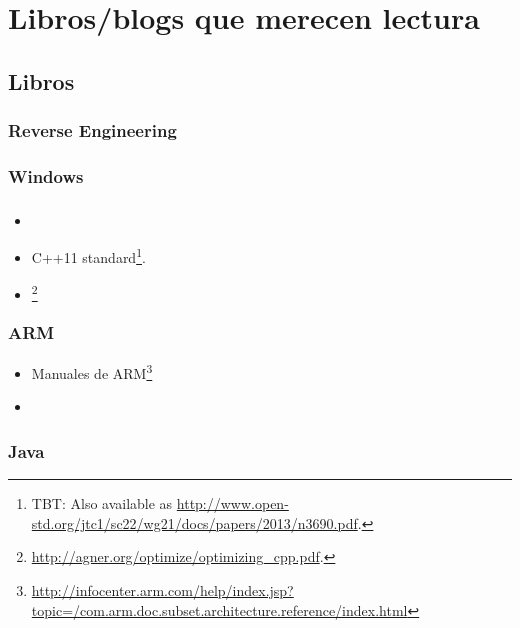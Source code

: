 \part{Libros/blogs que merecen lectura}

\chapter{Libros}

\section{Reverse Engineering}



\section{Windows}



\section{\CCpp}

\begin{itemize}
\item \KRBook

\item C++11 standard\footnote{\ac{TBT}: Also available as \url{http://www.open-std.org/jtc1/sc22/wg21/docs/papers/2013/n3690.pdf}.}.

\item [\AgnerFogCCP]\footnote{\AlsoAvailableAs \url{http://agner.org/optimize/optimizing_cpp.pdf}.}
\end{itemize}

\section{ARM}

\begin{itemize}
\item Manuales de ARM\footnote{\AlsoAvailableAs \url{http://infocenter.arm.com/help/index.jsp?topic=/com.arm.doc.subset.architecture.reference/index.html}}

\item \ARMSixFourRefURL
\end{itemize}

\section{Java}

